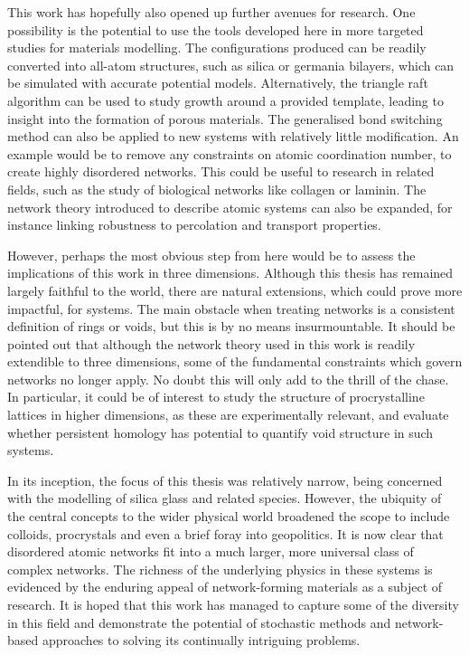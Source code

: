 This work has hopefully also opened up further avenues for research.
One possibility is the potential to use the tools developed here in more targeted studies for materials modelling.
The configurations produced can be readily converted into all\--atom structures, such as silica or germania bilayers, which can be simulated with accurate potential models.
Alternatively, the triangle raft algorithm can be used to study growth around a provided template, leading to insight into the formation of porous materials.
The generalised bond switching method can also be applied to new systems with relatively little modification.
An example would be to remove any constraints on atomic coordination number, to create highly disordered networks.
This could be useful to research in related fields, such as the study of  biological networks like collagen or laminin. 
The network theory introduced to describe atomic systems can also be expanded, for instance linking robustness to percolation and transport properties.

However, perhaps the most obvious step from here would be to assess the implications of this work in three dimensions.
Although this thesis has remained largely faithful to the \td{} world, there are natural extensions, which could prove more impactful, for \thd{} systems.
The main obstacle when treating \thd{} networks is a consistent definition of rings or voids, but this is by no means insurmountable. 
It should be pointed out that although the network theory used in this work is readily extendible to three dimensions, some of the fundamental constraints which govern \td{} networks no longer apply.
No doubt this will only add to the thrill of the chase.
In particular, it could be of interest to study the structure of procrystalline lattices in higher dimensions, as these are experimentally relevant, and evaluate whether persistent homology has potential to quantify void structure in such systems.

In its inception, the focus of this thesis was relatively narrow, being concerned with the modelling of \td{} silica glass and related species.
However, the ubiquity of the central concepts to the wider physical world broadened the scope to include colloids, procrystals and even a brief foray into geopolitics.
It is now clear that disordered \td{} atomic networks fit into a much larger, more universal class of complex networks. %
The richness of the underlying physics in these systems is evidenced by the enduring appeal of network\--forming materials as a subject of research.
It is hoped that this work has managed to capture some of the diversity in this field and demonstrate the potential of stochastic methods and network\--based approaches to solving its continually intriguing problems.



